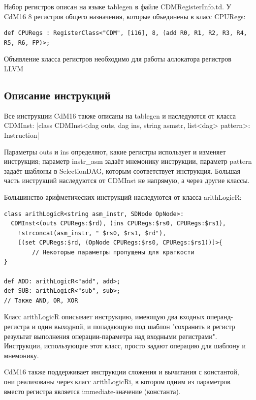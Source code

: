 \documentclass[a4paper,14pt]{extarticle}
\begin{document}
Набор регистров описан на языке tablegen в файле CDMRegisterInfo.td. У CdM16 8 регистров общего назначения, которые объединены в класс CPURegs:
\begin{verbatim}
def CPURegs : RegisterClass<"CDM", [i16], 8, (add R0, R1, R2, R3, R4, R5, R6, FP)>;
\end{verbatim}
Объявление класса регистров необходимо для работы аллокатора регистров LLVM

\subsection{Описание инструкций}
Все инструкции CdM16 также описаны на tablegen и наследуются от класса CDMInst:
|class CDMInst<dag outs, dag ins, string asmstr, list<dag> pattern>: Instruction|

Параметры outs и ins определяют, какие регистры использует и изменяет инструкция; параметр instr\_asm задаёт мнемонику инструкции, параметр pattern задаёт шаблоны в SelectionDAG, которым соответствует инструкция. Большая часть инструкций наследуются от CDMInst не напрямую, а через другие классы.

Большинство арифметических инструкций наследуются от класса arithLogicR:
\begin{verbatim}
class arithLogicR<string asm_instr, SDNode OpNode>:
  CDMInst<(outs CPURegs:$rd), (ins CPURegs:$rs0, CPURegs:$rs1),
    !strconcat(asm_instr, " $rs0, $rs1, $rd"),
    [(set CPURegs:$rd, (OpNode CPURegs:$rs0, CPURegs:$rs1))]>{
		// Некоторые параметры пропущены для краткости
}

def ADD: arithLogicR<"add", add>;
def SUB: arithLogicR<"sub", sub>;
// Также AND, OR, XOR
\end{verbatim}

Класс arithLogicR описывает инструкцию, имеющую два входных операнд-регистра и один выходной, и попадающую под шаблон "сохранить в регистр результат выполнения операции-параметра над входными регистрами". Инструкции, использующие этот класс, просто задают операцию для шаблону и мнемонику.

CdM16 также поддерживает инструкции сложения и вычитания с константой, они реализованы через класс arithLogicRi, в котором одним из параметров вместо регистра является immediate-значение (константа).
\end{document}
